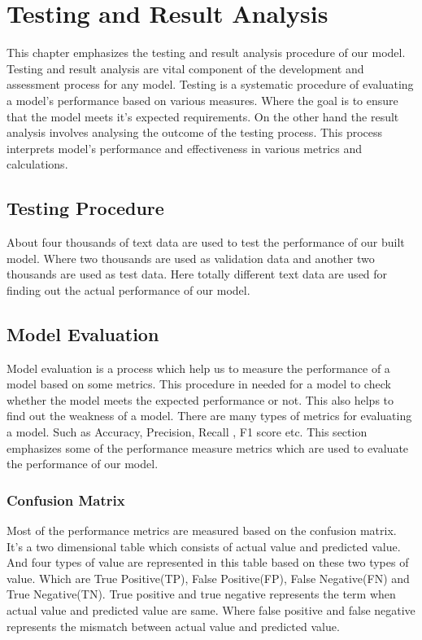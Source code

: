 \chapter{Testing and Result Analysis}
This chapter emphasizes the testing and result analysis procedure of our model. Testing and result analysis are vital component of the development and assessment process for any model. Testing is a systematic procedure of evaluating a model's performance based on various measures. Where the goal is to ensure that the model meets it's expected requirements. On the other hand the result analysis involves analysing the outcome of the testing process. This process interprets  model's performance and effectiveness in various metrics and calculations.

\section{Testing Procedure}
About four thousands of text data are used to test the performance of our built model. Where two thousands are used as validation data and another two thousands are used as test data. Here totally different text data are used for finding out the actual performance of our model.

\section{Model Evaluation}
Model evaluation is a process which help us to measure the performance of a model based on some metrics. This procedure in needed for a model to check whether the model meets the expected performance or not. This also helps to find out the weakness of a model. There are many types of metrics for evaluating a model. Such as Accuracy, Precision, Recall , F1 score etc. This section emphasizes some of the performance measure metrics which are used to evaluate the performance of our model.
\subsection{Confusion Matrix}
Most of the performance metrics are measured based on the confusion matrix. It's a two dimensional table which consists of actual value and predicted value. And four types of value are represented in this table based on these two types of value. Which are True Positive(TP), False Positive(FP), False Negative(FN) and True Negative(TN). True positive and true negative represents the term when actual value and predicted value are same. Where false positive and false negative represents the mismatch between actual value and predicted value.

